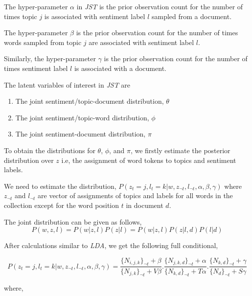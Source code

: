 The hyper-parameter \(\alpha\) in \textit{JST} is the prior observation count for the number of times topic \(j\) is associated with 
sentiment label \(l\) sampled from a document. 

The hyper-parameter \(\beta\) is the prior observation count for the number of times words sampled from topic \(j\)
are associated with sentiment label \(l\).

Similarly, the hyper-parameter \(\gamma\) is the prior observation count for the number of times sentiment label \(l\) is associated
with a document.

The latent variables of interest in \textit{JST} are
\begin{enumerate}
 \item The joint sentiment/topic-document distribution, \(\theta\)
 \item The joint sentiment/topic-word distribution, \(\phi\)
 \item The joint sentiment-document distribution, \(\pi\)
\end{enumerate}

To obtain the distributions for \(\theta\), \(\phi\), and \(\pi\), we firstly estimate the posterior distribution over \(z\) i.e, the assignment
of word tokens to topics and sentiment labels.

We need to estimate the distribution, \(P(z_t=j,l_t=k|w,z_{\neg t},l_{\neg t},\alpha,\beta,\gamma)\) where \(z_{\neg t}\) and \(l_{\neg t}\)
are vector of assignments of topics and labels for all words in the collection except for the word position \(t\) in document \(d\). 

The joint distribution can be given as follows,
\begin{equation}
P(w,z,l) = P(w|z,l)P(z|l) = P(w|z,l)P(z|l,d)P(l|d)
\end{equation}

After calculations similar to \textit{LDA}, we get the following full conditional,

\begin{equation}
P(z_t=j,l_t=k|w,z_{\neg t},l_{\neg t},\alpha,\beta,\gamma) = 
\frac{\{N_{i,j,k}\}_{\neg t} + \beta}{\{N_{j,k}\}_{\neg t}+V\beta}.
\frac{\{N_{j,k,d}\}_{\neg t} + \alpha}{\{N_{k,d}\}_{\neg t}+T\alpha}.
\frac{\{N_{k,d}\}_{\neg t} + \gamma}{\{N_{d}\}_{\neg t}+S\gamma}
\end{equation}

where,

